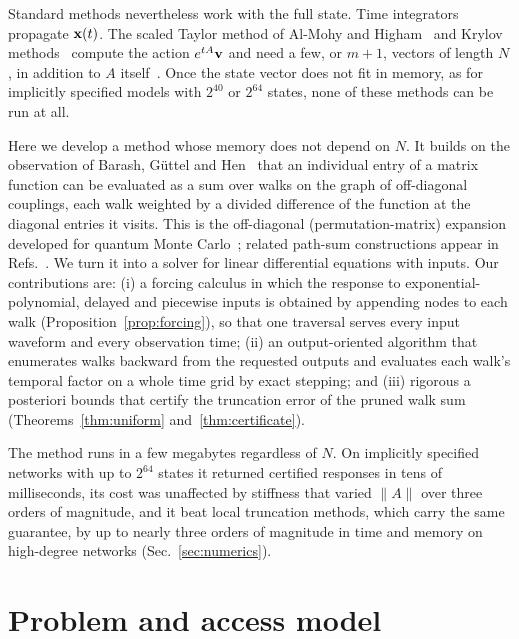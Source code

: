 \documentclass[aps,pra,superscriptaddress,floatfix,longbibliography,twocolumn]{revtex4-2}
\newcommand{\bx}{{\bf x}}
\newcommand{\bv}{{\bf v}}
\begin{document}
Standard methods nevertheless work with the full state. Time integrators propagate $\bx(t)$. The scaled Taylor method of Al-Mohy and Higham~\cite{almohy2011} and Krylov methods~\cite{hochbruck1997,sidje1998} compute the action $e^{tA}\bv$ and need a few, or $m+1$, vectors of length $N$, in addition to $A$ itself~\cite{guttel2020}. Once the state vector does not fit in memory, as for implicitly specified models with $2^{40}$ or $2^{64}$ states, none of these methods can be run at all.

Here we develop a method whose memory does not depend on $N$. It builds on the observation of Barash, G\"uttel and Hen~\cite{barash2022} that an individual entry of a matrix function can be evaluated as a sum over walks on the graph of off-diagonal couplings, each walk weighted by a divided difference of the function at the diagonal entries it visits. This is the off-diagonal (permutation-matrix) expansion developed for quantum Monte Carlo~\cite{albash2017,gupta2020pmr}; related path-sum constructions appear in Refs.~\cite{giscard2013,giscard2015,gorban2011}. We turn it into a solver for linear differential equations with inputs. Our contributions are: (i) a forcing calculus in which the response to exponential-polynomial, delayed and piecewise inputs is obtained by appending nodes to each walk (Proposition~\ref{prop:forcing}), so that one traversal serves every input waveform and every observation time; (ii) an output-oriented algorithm that enumerates walks backward from the requested outputs and evaluates each walk's temporal factor on a whole time grid by exact stepping; and (iii) rigorous a posteriori bounds that certify the truncation error of the pruned walk sum (Theorems~\ref{thm:uniform} and~\ref{thm:certificate}).

The method runs in a few megabytes regardless of $N$. On implicitly specified networks with up to $2^{64}$ states it returned certified responses in tens of milliseconds, its cost was unaffected by stiffness that varied $\|A\|$ over three orders of magnitude, and it beat local truncation methods, which carry the same guarantee, by up to nearly three orders of magnitude in time and memory on high-degree networks (Sec.~\ref{sec:numerics}).

\section{Problem and access model}\label{sec:problem}
\end{document}
